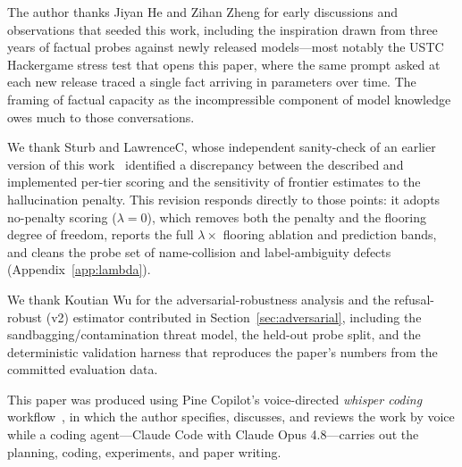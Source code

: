 \documentclass[11pt]{article}
\begin{document}
The author thanks Jiyan He and Zihan Zheng for early discussions and observations that seeded this work, including the inspiration drawn from three years of factual probes against newly released models---most notably the USTC Hackergame stress test that opens this paper, where the same prompt asked at each new release traced a single fact arriving in parameters over time. The framing of factual capacity as the incompressible component of model knowledge owes much to those conversations. 

We thank Sturb and LawrenceC, whose independent sanity-check of an earlier version of this work~\citep{sturb2026sanity} identified a discrepancy between the described and implemented per-tier scoring and the sensitivity of frontier estimates to the hallucination penalty. This revision responds directly to those points: it adopts no-penalty scoring ($\lambda = 0$), which removes both the penalty and the flooring degree of freedom, reports the full $\lambda \times$ flooring ablation and prediction bands, and cleans the probe set of name-collision and label-ambiguity defects (Appendix~\ref{app:lambda}).

We thank Koutian Wu for the adversarial-robustness analysis and the refusal-robust (v2) estimator contributed in Section~\ref{sec:adversarial}, including the sandbagging/contamination threat model, the held-out probe split, and the deterministic validation harness that reproduces the paper's numbers from the committed evaluation data.

This paper was produced using Pine Copilot's voice-directed \emph{whisper coding} workflow~\citep{pineai2026whispercoding}, in which the author specifies, discusses, and reviews the work by voice while a coding agent---Claude Code with Claude Opus 4.8---carries out the planning, coding, experiments, and paper writing.




\clearpage
\appendix

\end{document}
